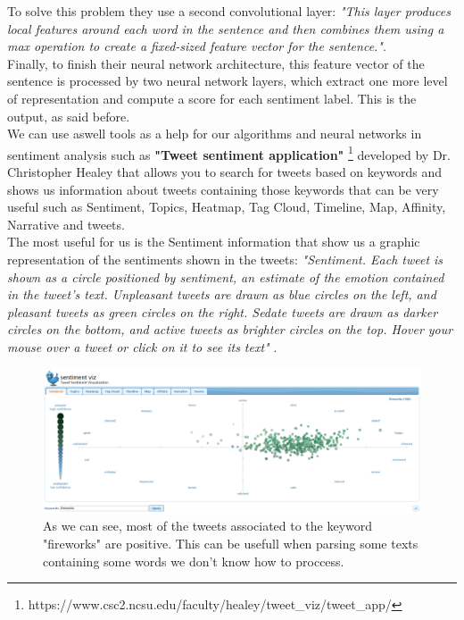 \documentclass[12pt,twoside]{article}
\theoremstyle{plain}
\theoremstyle{definition}
\theoremstyle{remark}
\begin{document}
		To solve this problem they use a second convolutional layer: \textit{"This layer produces local features around each word in the sentence and then combines them using a max operation to create a fixed-sized feature vector for the sentence."\cite{glorot2011domain}}.\\
		
		Finally, to finish their neural network architecture, this feature vector of the sentence is processed by two neural network layers, which extract one more level of representation and compute a score for each sentiment label. This is the output, as said before.\\
		
		
		
		We can use aswell tools as a help for our algorithms and neural networks in sentiment analysis such as \textbf{"Tweet sentiment application"} \footnote{https://www.csc2.ncsu.edu/faculty/healey/tweet\_viz/tweet\_app/} developed by Dr. Christopher Healey that allows you to search for tweets based on keywords and shows us information about tweets containing those keywords that can be very useful such as Sentiment, Topics, Heatmap, Tag Cloud, Timeline, Map, Affinity, Narrative and tweets. \\
		
		The most useful for us is the Sentiment information that show us a graphic representation of the sentiments shown in the tweets: \textit{"Sentiment. Each tweet is shown as a circle positioned by sentiment, an estimate of the emotion contained in the tweet's text. Unpleasant tweets are drawn as blue circles on the left, and pleasant tweets as green circles on the right. Sedate tweets are drawn as darker circles on the bottom, and active tweets as brighter circles on the top. Hover your mouse over a tweet or click on it to see its text"} \cite{tweet_sentiment_analysis}.
		
		\begin{figure}[H]
			\centering
			\includegraphics[scale=0.35]{./Pictures/fireworks_sentiment_visualization.png}
			\caption{As we can see, most of the tweets associated to the keyword "fireworks" are positive. This can be usefull when parsing some texts containing some words we don't know how to proccess.} 
		\end{figure}
		
\end{document}
